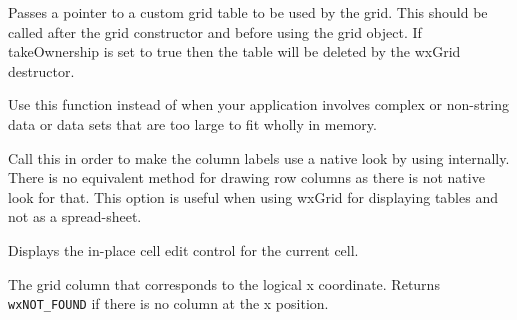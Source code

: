 \label{wxgridsettable}


Passes a pointer to a custom grid table to be used by the grid. This should be called
after the grid constructor and before using the grid object. If takeOwnership is set to
true then the table will be deleted by the wxGrid destructor.

Use this function instead of  when your
application involves complex or non-string data or data sets that are too large to fit
wholly in memory.


\label{wxgridsetsenativecollabels}


Call this in order to make the column labels use a native look by using
internally. There is no equivalent method for drawing row columns as
there is not native look for that. This option is useful when using
wxGrid for displaying tables and not as a spread-sheet.

\label{wxgridshowcelleditcontrol}


Displays the in-place cell edit control for the current cell.



\label{wxgridxtocol}



The grid column that corresponds to the logical x coordinate. Returns
{\tt wxNOT\_FOUND} if there is no column at the x position.



\label{wxgridxtoedgeofcol}

